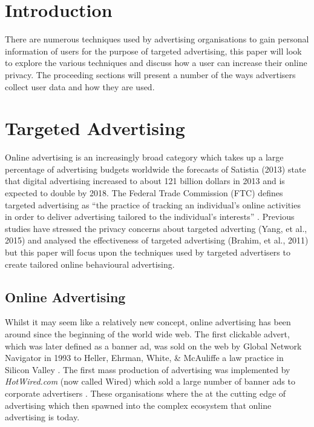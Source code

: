 \documentclass{article}
\begin{document}
\section{Introduction}
There are numerous techniques used by advertising organisations to gain personal information of users for the purpose of targeted advertising, this paper will look to explore the various techniques and discuss how a user can increase their online privacy. The proceeding sections will present a number of the ways advertisers collect user data and how they are used.  

\section{Targeted Advertising}
Online advertising is an increasingly broad category which takes up a large percentage of advertising budgets worldwide the forecasts of Satistia (2013) state that digital advertising increased to about 121 billion dollars in 2013 and is expected to double by 2018. The Federal Trade Commission (FTC) defines targeted advertising as ``the practice of tracking an individual’s online activities in order to deliver advertising tailored to the individual’s interests'' \parencite{comission2009}. Previous studies have stressed the privacy concerns about targeted adverting (Yang, et al., 2015) and analysed the effectiveness of targeted advertising (Brahim, et al., 2011) but this paper will focus upon the techniques used by targeted advertisers to create tailored online behavioural advertising. \newline

\subsection{Online Advertising}
Whilst it may seem like a relatively new concept, online advertising has been around since the beginning of the world wide web. The first clickable advert, which was later defined as a banner ad, was sold on the web by Global Network Navigator in 1993 to Heller, Ehrman, White, \& McAuliffe a law practice in Silicon Valley \parencite{oreilly}. The first mass production of advertising was implemented by \textit{HotWired.com} (now called Wired) which sold a large number of banner ads to corporate advertisers \parencite{firstAd}. These organisations where the at the cutting edge of advertising which then spawned into the complex ecosystem that online advertising is today.
\end{document}
